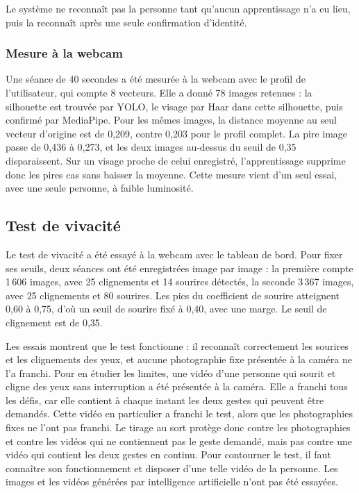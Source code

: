 Le système ne reconnaît pas la personne tant qu'aucun apprentissage n'a eu lieu, puis la reconnaît après une seule confirmation d'identité.

\subsubsection{Mesure à la webcam}\label{sec:webcam}

\begin{maj}
Une séance de 40 secondes a été mesurée à la webcam avec le profil de l'utilisateur, qui compte 8 vecteurs. Elle a donné 78 images retenues : la silhouette est trouvée par YOLO, le visage par Haar dans cette silhouette, puis confirmé par MediaPipe. Pour les mêmes images, la distance moyenne au seul vecteur d'origine est de 0,209, contre 0,203 pour le profil complet. La pire image passe de 0,436 à 0,273, et les deux images au-dessus du seuil de 0,35 disparaissent. Sur un visage proche de celui enregistré, l'apprentissage supprime donc les pires cas sans baisser la moyenne. Cette mesure vient d'un seul essai, avec une seule personne, à faible luminosité.\nouvmark{}
\end{maj}

\subsection{Test de vivacité}\label{sec:vivacite}

\begin{maj}
Le test de vivacité a été essayé à la webcam avec le tableau de bord. Pour fixer ses seuils, deux séances ont été enregistrées image par image : la première compte 1\,606 images, avec 25 clignements et 14 sourires détectés, la seconde 3\,367 images, avec 25 clignements et 80 sourires. Les pics du coefficient de sourire atteignent 0,60 à 0,75, d'où un seuil de sourire fixé à 0,40, avec une marge. Le seuil de clignement est de 0,35.

Les essais montrent que le test fonctionne : il reconnaît correctement les sourires et les clignements des yeux, et aucune photographie fixe présentée à la caméra ne l'a franchi. Pour en étudier les limites, une vidéo d'une personne qui sourit et cligne des yeux sans interruption a été présentée à la caméra. Elle a franchi tous les défis, car elle contient à chaque instant les deux gestes qui peuvent être demandés. Cette vidéo en particulier a franchi le test, alors que les photographies fixes ne l'ont pas franchi. Le tirage au sort protège donc contre les photographies et contre les vidéos qui ne contiennent pas le geste demandé, mais pas contre une vidéo qui contient les deux gestes en continu. Pour contourner le test, il faut connaître son fonctionnement et disposer d'une telle vidéo de la personne. Les images et les vidéos générées par intelligence artificielle n'ont pas été essayées.
\end{maj}

